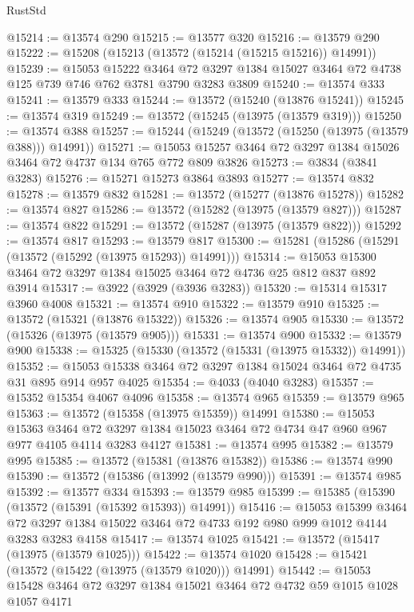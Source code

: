 \begin{lexlean}{RustStd}
\begin{coremodule}
@15214 := @13574 @290
@15215 := @13577 @320
@15216 := @13579 @290
@15222 := @15208 (@15213 (@13572 (@15214 (@15215 @15216)) @14991))
@15239 := @15053
    @15222
    @3464
    @72
    @3297
    @1384
    @15027
    @3464
    @72
    @4738
    @125
    @739
    @746
    @762
    @3781
    @3790
    @3283
    @3809
@15240 := @13574 @333
@15241 := @13579 @333
@15244 := @13572 (@15240 (@13876 @15241))
@15245 := @13574 @319
@15249 := @13572 (@15245 (@13975 (@13579 @319)))
@15250 := @13574 @388
@15257 := @15244 (@15249 (@13572 (@15250 (@13975 (@13579 @388))) @14991))
@15271 := @15053 @15257 @3464 @72 @3297 @1384 @15026 @3464 @72 @4737 @134 @765 @772 @809 @3826
@15273 := @3834 (@3841 @3283)
@15276 := @15271 @15273 @3864 @3893
@15277 := @13574 @832
@15278 := @13579 @832
@15281 := @13572 (@15277 (@13876 @15278))
@15282 := @13574 @827
@15286 := @13572 (@15282 (@13975 (@13579 @827)))
@15287 := @13574 @822
@15291 := @13572 (@15287 (@13975 (@13579 @822)))
@15292 := @13574 @817
@15293 := @13579 @817
@15300 := @15281 (@15286 (@15291 (@13572 (@15292 (@13975 @15293)) @14991)))
@15314 := @15053 @15300 @3464 @72 @3297 @1384 @15025 @3464 @72 @4736 @25 @812 @837 @892 @3914
@15317 := @3922 (@3929 (@3936 @3283))
@15320 := @15314 @15317 @3960 @4008
@15321 := @13574 @910
@15322 := @13579 @910
@15325 := @13572 (@15321 (@13876 @15322))
@15326 := @13574 @905
@15330 := @13572 (@15326 (@13975 (@13579 @905)))
@15331 := @13574 @900
@15332 := @13579 @900
@15338 := @15325 (@15330 (@13572 (@15331 (@13975 @15332)) @14991))
@15352 := @15053 @15338 @3464 @72 @3297 @1384 @15024 @3464 @72 @4735 @31 @895 @914 @957 @4025
@15354 := @4033 (@4040 @3283)
@15357 := @15352 @15354 @4067 @4096
@15358 := @13574 @965
@15359 := @13579 @965
@15363 := @13572 (@15358 (@13975 @15359)) @14991
@15380 := @15053
    @15363
    @3464
    @72
    @3297
    @1384
    @15023
    @3464
    @72
    @4734
    @47
    @960
    @967
    @977
    @4105
    @4114
    @3283
    @4127
@15381 := @13574 @995
@15382 := @13579 @995
@15385 := @13572 (@15381 (@13876 @15382))
@15386 := @13574 @990
@15390 := @13572 (@15386 (@13992 (@13579 @990)))
@15391 := @13574 @985
@15392 := @13577 @334
@15393 := @13579 @985
@15399 := @15385 (@15390 (@13572 (@15391 (@15392 @15393)) @14991))
@15416 := @15053
    @15399
    @3464
    @72
    @3297
    @1384
    @15022
    @3464
    @72
    @4733
    @192
    @980
    @999
    @1012
    @4144
    @3283
    @3283
    @4158
@15417 := @13574 @1025
@15421 := @13572 (@15417 (@13975 (@13579 @1025)))
@15422 := @13574 @1020
@15428 := @15421 (@13572 (@15422 (@13975 (@13579 @1020))) @14991)
@15442 := @15053 @15428 @3464 @72 @3297 @1384 @15021 @3464 @72 @4732 @59 @1015 @1028 @1057 @4171

\end{coremodule}
\end{lexlean}
